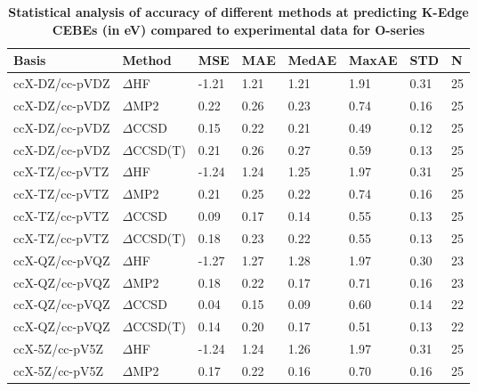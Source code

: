 \begin{table}
  \caption{\textbf{Statistical analysis of accuracy of different methods at predicting K-Edge CEBEs (in eV) compared to experimental data for O-series}}
  \begin{tabular}{l l l l l l l l }
    \toprule
    \textbf{Basis} & \textbf{Method} & \textbf{MSE} & \textbf{MAE} & \textbf{MedAE} & \textbf{MaxAE} & \textbf{STD} & \textbf{N} \\ 
    \midrule
    ccX-DZ/cc-pVDZ & $\Delta$HF & -1.21 & 1.21 & 1.21 & 1.91 & 0.31 & 25 \\ 
    ccX-DZ/cc-pVDZ & $\Delta$MP2 & 0.22 & 0.26 & 0.23 & 0.74 & 0.16 & 25 \\ 
    ccX-DZ/cc-pVDZ & $\Delta$CCSD & 0.15 & 0.22 & 0.21 & 0.49 & 0.12 & 25 \\ 
    ccX-DZ/cc-pVDZ & $\Delta$CCSD(T) & 0.21 & 0.26 & 0.27 & 0.59 & 0.13 & 25 \\ 
    ccX-TZ/cc-pVTZ & $\Delta$HF & -1.24 & 1.24 & 1.25 & 1.97 & 0.31 & 25 \\ 
    ccX-TZ/cc-pVTZ & $\Delta$MP2 & 0.21 & 0.25 & 0.22 & 0.74 & 0.16 & 25 \\ 
    ccX-TZ/cc-pVTZ & $\Delta$CCSD & 0.09 & 0.17 & 0.14 & 0.55 & 0.13 & 25 \\ 
    ccX-TZ/cc-pVTZ & $\Delta$CCSD(T) & 0.18 & 0.23 & 0.22 & 0.55 & 0.13 & 25 \\ 
    ccX-QZ/cc-pVQZ & $\Delta$HF & -1.27 & 1.27 & 1.28 & 1.97 & 0.30 & 23 \\ 
    ccX-QZ/cc-pVQZ & $\Delta$MP2 & 0.18 & 0.22 & 0.17 & 0.71 & 0.16 & 23 \\ 
    ccX-QZ/cc-pVQZ & $\Delta$CCSD & 0.04 & 0.15 & 0.09 & 0.60 & 0.14 & 22 \\ 
    ccX-QZ/cc-pVQZ & $\Delta$CCSD(T) & 0.14 & 0.20 & 0.17 & 0.51 & 0.13 & 22 \\ 
    ccX-5Z/cc-pV5Z & $\Delta$HF & -1.24 & 1.24 & 1.26 & 1.97 & 0.31 & 25 \\ 
    ccX-5Z/cc-pV5Z & $\Delta$MP2 & 0.17 & 0.22 & 0.16 & 0.70 & 0.16 & 25 \\ 
    \bottomrule
  \end{tabular}
\end{table}
